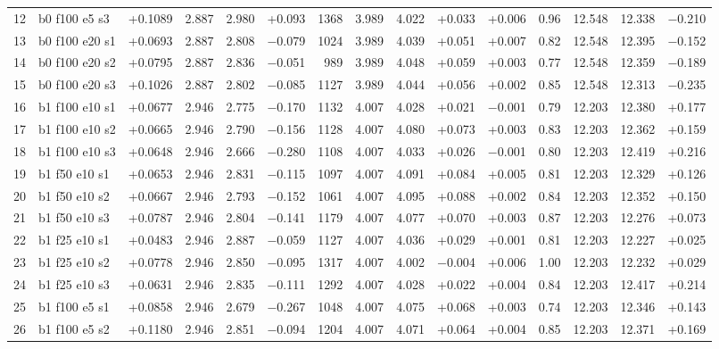 \documentclass[10pt,a4paper]{article}
\begin{document}
\begin{landscape}
\begin{table}[h!]
\begin{tabular}{rlrrrrrrrrrrrrr}
12 & b0 f100 e5 s3 & +0.1089 & 2.887 & 2.980 & +0.093 & 1368 & 3.989 & 4.022 & +0.033 & +0.006 & 0.96 & 12.548 & 12.338 & $-$0.210\\
13 & b0 f100 e20 s1 & +0.0693 & 2.887 & 2.808 & $-$0.079 & 1024 & 3.989 & 4.039 & +0.051 & +0.007 & 0.82 & 12.548 & 12.395 & $-$0.152\\
14 & b0 f100 e20 s2 & +0.0795 & 2.887 & 2.836 & $-$0.051 & 989 & 3.989 & 4.048 & +0.059 & +0.003 & 0.77 & 12.548 & 12.359 & $-$0.189\\
15 & b0 f100 e20 s3 & +0.1026 & 2.887 & 2.802 & $-$0.085 & 1127 & 3.989 & 4.044 & +0.056 & +0.002 & 0.85 & 12.548 & 12.313 & $-$0.235\\
\midrule
16 & b1 f100 e10 s1 & +0.0677 & 2.946 & 2.775 & $-$0.170 & 1132 & 4.007 & 4.028 & +0.021 & $-$0.001 & 0.79 & 12.203 & 12.380 & +0.177\\
17 & b1 f100 e10 s2 & +0.0665 & 2.946 & 2.790 & $-$0.156 & 1128 & 4.007 & 4.080 & +0.073 & +0.003 & 0.83 & 12.203 & 12.362 & +0.159\\
18 & b1 f100 e10 s3 & +0.0648 & 2.946 & 2.666 & $-$0.280 & 1108 & 4.007 & 4.033 & +0.026 & $-$0.001 & 0.80 & 12.203 & 12.419 & +0.216\\
19 & b1 f50 e10 s1 & +0.0653 & 2.946 & 2.831 & $-$0.115 & 1097 & 4.007 & 4.091 & +0.084 & +0.005 & 0.81 & 12.203 & 12.329 & +0.126\\
20 & b1 f50 e10 s2 & +0.0667 & 2.946 & 2.793 & $-$0.152 & 1061 & 4.007 & 4.095 & +0.088 & +0.002 & 0.84 & 12.203 & 12.352 & +0.150\\
21 & b1 f50 e10 s3 & +0.0787 & 2.946 & 2.804 & $-$0.141 & 1179 & 4.007 & 4.077 & +0.070 & +0.003 & 0.87 & 12.203 & 12.276 & +0.073\\
22 & b1 f25 e10 s1 & +0.0483 & 2.946 & 2.887 & $-$0.059 & 1127 & 4.007 & 4.036 & +0.029 & +0.001 & 0.81 & 12.203 & 12.227 & +0.025\\
23 & b1 f25 e10 s2 & +0.0778 & 2.946 & 2.850 & $-$0.095 & 1317 & 4.007 & 4.002 & $-$0.004 & +0.006 & 1.00 & 12.203 & 12.232 & +0.029\\
24 & b1 f25 e10 s3 & +0.0631 & 2.946 & 2.835 & $-$0.111 & 1292 & 4.007 & 4.028 & +0.022 & +0.004 & 0.84 & 12.203 & 12.417 & +0.214\\
25 & b1 f100 e5 s1 & +0.0858 & 2.946 & 2.679 & $-$0.267 & 1048 & 4.007 & 4.075 & +0.068 & +0.003 & 0.74 & 12.203 & 12.346 & +0.143\\
26 & b1 f100 e5 s2 & +0.1180 & 2.946 & 2.851 & $-$0.094 & 1204 & 4.007 & 4.071 & +0.064 & +0.004 & 0.85 & 12.203 & 12.371 & +0.169\\

\end{tabular}
\end{table}
\end{landscape}
\end{document}
